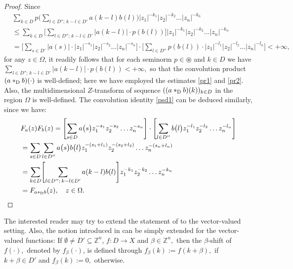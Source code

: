 \documentclass{amsart}
\theoremstyle{definition}
\theoremstyle{remark}
\numberwithin{equation}{section}
\begin{document}
\begin{proof}
Since {\small
\begin{align*} &
\sum_{k\in D}p\Biggl( \sum_{l\in D'';\, k-l\in D'}a(k-l)b(l)\Biggr)\bigl|z_{1}\bigr|^{-k_{1}}\bigl|z_{2}\bigr|^{-k_{2}}\ldots \bigl| z_{n}\bigr|^{-k_{n}}
\\& \leq \sum_{k\in D}\Biggl[ \sum_{l\in D'';\, k-l\in D'}|a(k-l)| \cdot p(b(l)) \Biggr]\bigl|z_{1}\bigr|^{-k_{1}}\bigl|z_{2}\bigr|^{-k_{2}}\ldots \bigl| z_{n}\bigr|^{-k_{n}}
\\& =\Biggl[\sum_{s\in D'}|a(s)| \cdot \bigl|z_{1}\bigr|^{-s_{1}}\bigl|z_{2}\bigr|^{-s_{2}}\ldots \bigl| z_{n}\bigr|^{-s_{n}}\Biggr] \cdot \Biggl[ \sum_{l\in D''}p(b(l)) \cdot
\bigl|z_{1}\bigr|^{-l_{1}}\bigl|z_{2}\bigr|^{-l_{2}}\ldots \bigl| z_{n}\bigr|^{-l_{n}}\Biggr]<+\infty,
\end{align*}}for any $z\in \Omega$, it readily follows that for each seminorm $p\in \circledast$  and $k\in D$ we have $\sum_{l\in D'';\, k-l\in D'}|a(k-l)| \cdot p(b(l))<+\infty, $ so that the convolution product $(a\ast_{{\rm D}} b)(\cdot)$ is well-defined; here we have employed the estimates \eqref{pr1} and \eqref{pr2}.
Also, the multidimensional $Z$-transform of sequence $((a\ast_{{\rm D}} b)(k))_{k\in D}$ in the region $\Omega$ is well-defined. The convolution identity \eqref{psd1} can be deduced similarly, since we have:
\begin{align*} &
F_{a}(z)F_{b}(z)=\Biggl[\sum _{s\in D }a\bigl(s\bigr)z_{1}^{-s_{1}}z_{2}^{-s_{2}}\ldots z_{n}^{-s_{n}}\Biggr] \cdot \Biggl[ \sum _{l\in D'' }b\bigl(l\bigr)z_{1}^{-l_{1}}z_{2}^{-l_{2}}\ldots z_{n}^{-l_{n}}\Biggr]
\\& =\sum _{s\in D }\sum _{l\in D'' } a\bigl(s\bigr)b\bigl(l\bigr)z_{1}^{-(s_{1}+l_{1})}z_{2}^{-(s_{2}+l_{2})}\ldots z_{n}^{-(s_{n}+l_{n})} \\&
=\sum_{k\in D}\Biggl[ \sum_{l\in D'';\, k-l\in D'}a(k-l)b(l)\Biggr] z_{1}^{-k_{1}}z_{2}^{-k_{2}}\ldots z_{n}^{-k_{n}} 
\\& =F_{a\ast_{{\rm D}} b}(z) , \quad z\in \Omega.
\end{align*} 
\end{proof}

The interested reader may try to extend the statement of \cite[Theorem 3.1.5]{gregor} to the vector-valued setting. Also, the notion introduced in \cite[Definition 3.1.3]{gregor} can be simply extended for the vector-valued functions: If $\emptyset \neq D' \subseteq {\mathbb Z}^{n}$, $f : D\rightarrow X$ and $\beta \in {\mathbb Z}^{n},$ then the $\beta$-shift of $f(\cdot),$ denoted by $f_{\beta}(\cdot)$, is defined through
$f_{\beta}(k):=f(k+\beta),$ if $k+\beta \in D'$ and $f_{\beta}(k):=0,$ otherwise.
\end{document}
